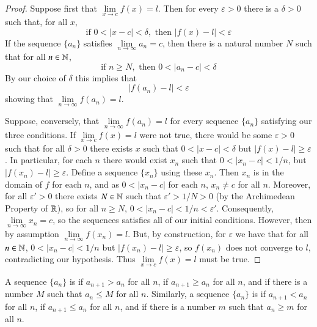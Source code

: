 \begin{proof}
    Suppose first that $\lim\limits_{x\rightarrow c}f(x) = l$. Then for every $\varepsilon > 0$ there is a $\delta > 0$ such that, for all $x$, \begin{equation*}
        \text{if } 0 < |x-c| < \delta, \text{ then } |f(x) - l| < \varepsilon
    \end{equation*}
    If the sequence $\{a_n\}$ satisfies $\lim\limits_{n\rightarrow \infty}a_n = c$, then there is a natural number $N$ such that for all $n \in \mathbb N$, \begin{equation*}
        \text{if } n \geq N, \text{ then } 0 < |a_n - c| < \delta
    \end{equation*}
    By our choice of $\delta$ this implies that \begin{equation*}
        |f(a_n) - l| <\varepsilon
    \end{equation*}
    showing that $\lim\limits_{n\rightarrow \infty} f(a_n) = l$.


    Suppose, conversely, that $\lim\limits_{n\rightarrow \infty}f(a_n) = l$ for every sequence $\{a_n\}$ satisfying our three conditions. If $\lim\limits_{x\rightarrow c}f(x) = l$ were not true, there would be some $\varepsilon > 0$ such that for all $\delta > 0$ there exists $x$ such that $0 < |x-c| < \delta$ but $|f(x) - l| \geq \varepsilon$. In particular, for each $n$ there would exist $x_n$ such that $0<|x_n - c| < 1/n$, but $|f(x_n) - l| \geq \varepsilon$. Define a sequence $\{x_n\}$ using these $x_n$. Then $x_n$ is in the domain of $f$ for each $n$, and as $0 < |x_n-c|$ for each $n$, $x_n \neq c$ for all $n$. Moreover, for all $\varepsilon' > 0$ there exists $N \in \mathbb N$ such that $\varepsilon' > 1/N > 0$ (by the Archimedean Property of $\mathbb R$), so for all $n \geq N$, $0 < |x_n - c| < 1/n < \varepsilon'$. Consequently, $\lim\limits_{n\rightarrow \infty}x_n = c$, so the sequences satisfies all of our initial conditions. However, then by assumption $\lim\limits_{n\rightarrow \infty}f(x_n) = l$. But, by construction, for $\varepsilon$ we have that for all $n \in \mathbb N$, $0 < |x_n - c| < 1/n$ but $|f(x_n) - l| \geq \varepsilon$, so $f(x_n)$ does not converge to $l$, contradicting our hypothesis. Thus $\lim\limits_{x\rightarrow c}f(x) = l$ must be true.
\end{proof}


\begin{defn}
    A sequence $\{a_n\}$ is  if $a_{n+1} > a_n$ for all $n$,  if $a_{n+1} \geq a_n$ for all $n$, and  if there is a number $M$ such that $a_n \leq M$ for all $n$. Similarly, a sequence $\{a_n\}$ is  if $a_{n+1} < a_n$ for all $n$,  if $a_{n+1} \leq a_n$ for all $n$, and  if there is a number $m$ such that $a_n \geq m$ for all $n$.
\end{defn}

